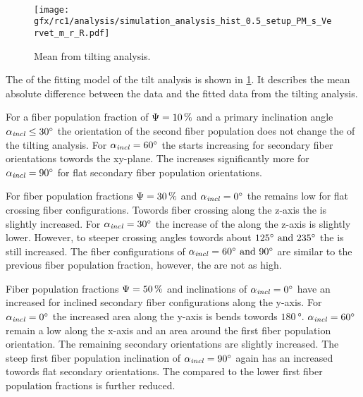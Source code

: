 \paragraph{\rvalue}
% 
\begin{figure}[!p]
\centering
\texttt{[image: gfx/rc1/analysis/simulation\_analysis\_hist\_0.5\_setup\_PM\_s\_Vervet\_m\_r\_R.pdf]}
\caption{Mean \rvalue{} from tilting analysis. }
\label{fig:sim_ana_rvalue}
\end{figure}
% 
The \rvalue{} of the fitting model of the tilt analysis is shown in \cref{fig:sim_ana_rvalue}.
It describes the mean absolute difference between the data and the fitted data from the tilting analysis.
\par
%
For a fiber population fraction of $\textnormal{$\Psi$}=\SI{10}{\percent}$ and a primary inclination angle $\textnormal{$\alpha_{\mathit{incl}}$}\leq\SI{30}{\degree}$ the orientation of the second fiber population does not change the \rvalue{} of the tilting analysis.
For $\textnormal{$\alpha_{\mathit{incl}}$}=\SI{60}{\degree}$ the \rvalue{} starts increasing for secondary fiber orientations towords the xy-plane.
The \rvalue{} increases significantly more for $\textnormal{$\alpha_{\mathit{incl}}$}=\SI{90}{\degree}$ for flat secondary fiber population orientations.
\par
% 
For fiber population fractions $\textnormal{$\Psi$}=\SI{30}{\percent}$ and $\textnormal{$\alpha_{\mathit{incl}}$}=\SI{0}{\degree}$ the \rvalue{} remains low for flat crossing fiber configurations.
Towords fiber crossing along the z-axis the \rvalue{} is slightly increased.
For $\textnormal{$\alpha_{\mathit{incl}}$}=\SI{30}{\degree}$ the increase of the \rvalue{} along the z-axis is slightly lower.
However, to steeper crossing angles towords about $\SIlist{125;235}{\degree}$ the \rvalue{} is still increased.
The fiber configurations of $\modelInc=\SIlist{60;90}{\degree}$ are similar to the previous fiber population fraction, however, the \rvalue{} are not as high.
\par
%
Fiber population fractions $\textnormal{$\Psi$}=\SI{50}{\percent}$ and inclinations of $\textnormal{$\alpha_{\mathit{incl}}$}=\SI{0}{\degree}$ have an increased \rvalue{} for inclined secondary fiber configurations along the y-axis.
For $\textnormal{$\alpha_{\mathit{incl}}$}=\SI{0}{\degree}$ the increased area along the y-axis is bends towords $\SI{180}{\degree}$.
$\textnormal{$\alpha_{\mathit{incl}}$}=\SI{60}{\degree}$ remain a low \rvalue{} along the x-axis and an area around the first fiber population orientation.
The remaining secondary orientations are slightly increased.
The steep first fiber population inclination of $\textnormal{$\alpha_{\mathit{incl}}$}=\SI{90}{\degree}$ again has an increased \rvalue{} towords flat secondary orientations.
The \rvalue{} compared to the lower first fiber population fractions is further reduced.
